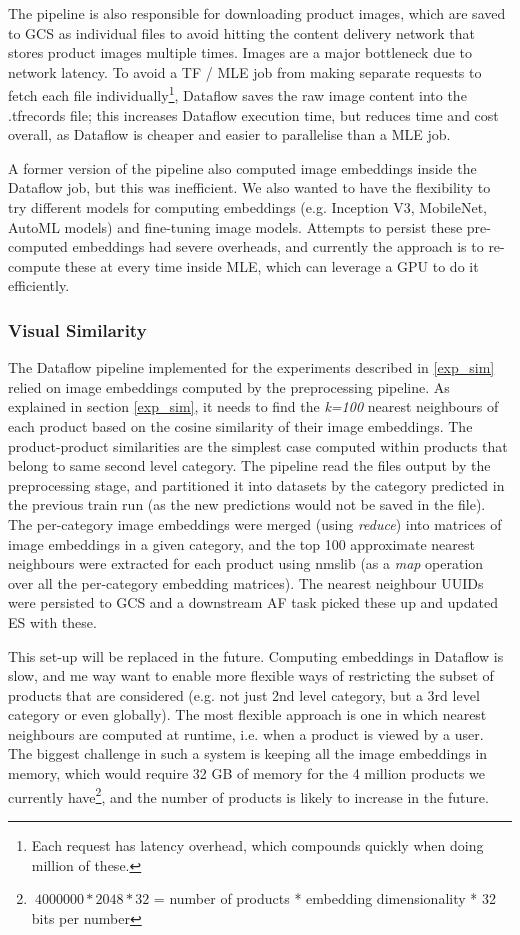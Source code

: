 The pipeline is also responsible for downloading product images, which are saved to GCS as individual files to avoid hitting the content delivery network that stores product images multiple times.
Images are a major bottleneck due to network latency.
To avoid a TF / MLE job from making separate requests to fetch each file individually\footnote{Each request has latency overhead, which compounds quickly when doing million of these.}, Dataflow saves the raw image content into the .tfrecords file; this increases Dataflow execution time, but reduces time and cost overall, as Dataflow is cheaper and easier to parallelise than a MLE job.

A former version of the pipeline also computed image embeddings inside the Dataflow job, but this was inefficient.
We also wanted to have the flexibility to try different models for computing embeddings (e.g. Inception V3, MobileNet, AutoML models) and fine-tuning image models.
Attempts to persist these pre-computed embeddings had severe overheads, and currently the approach is to re-compute these at every time inside MLE, which can leverage a GPU to do it efficiently.

\subsubsection{Visual Similarity}
\label{vis_sim_pp}

The Dataflow pipeline implemented for the experiments described in \ref{exp_sim} relied on image embeddings computed by the preprocessing pipeline.
As explained in section \ref{exp_sim}, it needs to find the \textit{k=100} nearest neighbours of each product based on the cosine similarity of their image embeddings.
The product-product  similarities are the simplest case computed within products that belong to same second level category.
The pipeline read the files output by the preprocessing stage, and partitioned it into datasets by the category predicted in the previous train run (as the new predictions would not be saved in the file).
The per-category image embeddings were merged (using \textit{reduce}) into matrices of image embeddings in a given category, and the top 100 approximate nearest neighbours were extracted for each product using nmslib \cite{nmslib} (as a \textit{map} operation over all the per-category embedding matrices).
The nearest neighbour UUIDs were persisted to GCS and a downstream AF task picked these up and updated ES with these.

This set-up will be replaced in the future.
Computing embeddings in Dataflow is slow, and me way want to enable more flexible ways of restricting the subset of products that are considered (e.g. not just 2nd level category, but a 3rd level category or even globally).
The most flexible approach is one in which nearest neighbours are computed at runtime, i.e. when a product is viewed by a user.
The biggest challenge in such a system is keeping all the image embeddings in memory, which would require 32 GB of memory for the 4 million products we currently have\footnote{$~4000000 * 2048 * 32$ = number of products * embedding dimensionality * 32 bits per number}, and the number of products is likely to increase in the future.

